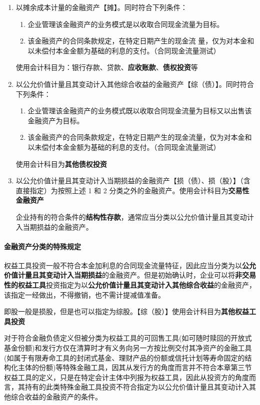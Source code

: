 \documentclass[UTF8,12pt]{ctexart}
\numberwithin{equation}{section} %
\numberwithin{figure}{section}
\numberwithin{table}{section}
\begin{document}
	\begin{enumerate}
		\item 以摊余成本计量的金融资产【摊】。同时符合下列条件：
		\begin{enumerate}
			\item 企业管理该金融资产的业务模式是以收取合同现金流量为目标。
			
			\item 该金融资产的合同条款规定，在特定日期产生的现金流 量，仅为对本金和以未偿付本金金额为基础的利息的支付。（合同现金流量测试）
		\end{enumerate}
	
		使用会计科目为：银行存款、贷款、\textbf{应收账款}、\textbf{债权投资}等
		
		\item 以公允价值计量且其变动计入其他综合收益的金融资产【综（债）】。同时符合下列条件：
		\begin{enumerate}
			\item 企业管理该金融资产的业务模式既以收取合同现金流量为目标又以出售该金融资产为目标。
			
			\item 该金融资产的合同条款规定，在特定日期产生的现金流量，仅为对本金和以未偿付本金金额为基础的利息的支付。（合同现金流量测试）
		\end{enumerate}
	
		使用会计科目为\textbf{其他债权投资}
		
		\item 以公允价值计量且其变动计入当期损益的金融资产【损（债）、损（股）】（含直接指定）为按照上述 1 和 2 分类之外的金融资产。使用会计科目为\textbf{交易性金融资产}
		
		企业持有的符合条件的\textbf{结构性存款}，通常应当分类以公允价值计量且其变动计入当期损益的金融资产。
	\end{enumerate}
	
	\paragraph{金融资产分类的特殊规定}
	权益工具投资一般不符合本金加利息的合同现金流量特征，因此应当分类为以\textbf{公允价值计量且其变动计入当期损益}的金融资产。但是初始确认时，企业可以将\textbf{非交易性的权益工具}投资指定为以\textbf{公允价值计量且其变动计入其他综合收益}的金融资产，该指定一经做出，不得撤销，也不需计提减值准备。
	
	即股一般是损股，但是也可以指定为综股。【综（股）】使用会计科目为\textbf{其他权益工具投资}
	
	对于符合金融负债定义但被分类为权益工具的可回售工具(如可随时赎回的开放式基金份额)和发行方仅在清算时才有义务向另一方按比例交付其净资产的金融工具(如属于有限寿命工具的封闭式基金、理财产品的份额或信托计划等寿命固定的结构化主体的份额)等特殊金融工具，因其从发行方的角度而言并不符合本章第三节权益工具的定义，只是在特定会计主体中列报为权益工具，因此从投资方的角度而言，其持有的此类特殊金融工具投资不符合指定为以公允价值计量且其变动计入其他综合收益的金融资产的条件。
	
\end{document}
